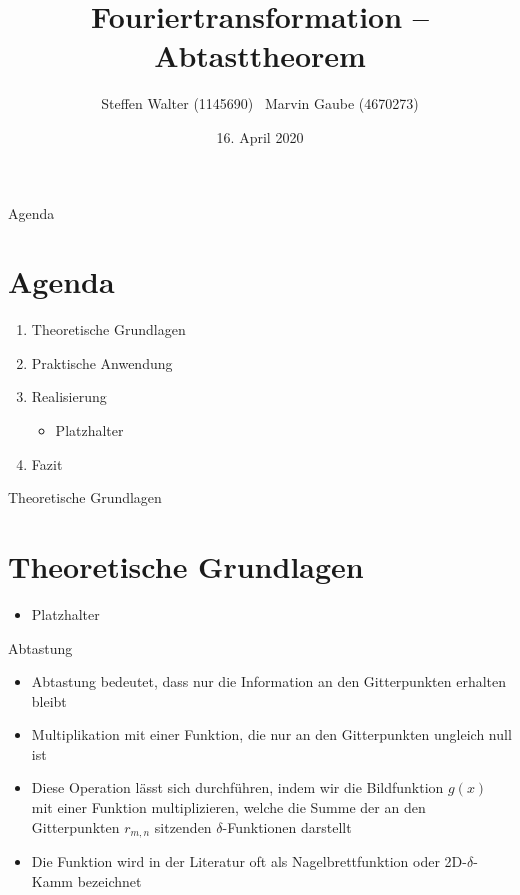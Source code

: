 \documentclass{beamer}
\title{Fouriertransformation -- Abtasttheorem}
\author{Steffen Walter (1145690) \ Marvin Gaube (4670273)}
\institute{Duale Hochschule Baden-Württemberg -- Stuttgart\newline Vorlesung: Digitale Bildverarbeitung}
\date{16. April 2020}
\begin{document}
	\maketitle
	\begin{frame}{Agenda}
		\section{Agenda}
		\begin{enumerate}
			\item Theoretische Grundlagen
			\item Praktische Anwendung
			\item Realisierung
			\begin{itemize}
				\item Platzhalter
			\end{itemize}
			\item Fazit
		\end{enumerate}
	\end{frame}

	
	\begin{frame}{Theoretische Grundlagen}
	\section{Theoretische Grundlagen}
	\nocite{bildverarbeitung}
	\begin{itemize}
		\item Platzhalter
	\end{itemize}
	\end{frame}

	\begin{frame}{Abtastung}
	\begin{itemize}
		\item Abtastung bedeutet, dass nur die Information an den Gitterpunkten erhalten bleibt
		\item Multiplikation mit einer Funktion, die nur an den Gitterpunkten ungleich null ist
		\item Diese Operation lässt sich durchführen, indem wir die Bildfunktion $g(x)$ mit einer Funktion multiplizieren, welche die Summe der an den Gitterpunkten $r_{m,n}$ sitzenden $\delta$-Funktionen darstellt
		\item Die Funktion wird in der Literatur oft als Nagelbrettfunktion oder 2D-$\delta$-Kamm bezeichnet
	\end{itemize}	
	\end{frame}
\end{document}
